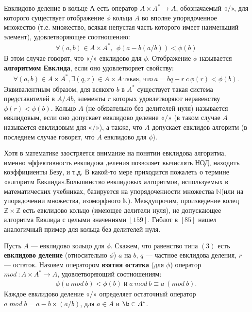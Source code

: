 \begin{determ}
Евклидово деление в кольце $А$ есть оператор $A\times A^* \rightarrow A$, обозначаемый «$/$», для которого существует отображение $\phi$ кольца $A$ во вполне упорядоченное множество (т.е. множество, всякая непустая часть которого имеет наименьший элемент), удовлетворяющее соотношению:
\begin{align}
\forall(a,b) \in A \times A^*, \:\: \phi(a - b(a/b)) < \phi(b)
\end{align}
В этом случае говорят, что «$/$» евклидово для $\phi$. Отображение $\phi$ называется \textbf{алгоритмом Евклида}, если оно удовлетворяет свойству:
\begin{align}
\forall(a,b) \in A \times A^*, \exists(q,r) \in A \times A \:\text{такая, что}\: a = bq + r \: c \:\phi(r) < \phi(b)\text{.}
\end{align}
Эквивалентным образом, для всякого $b$ в $A^*$ существует такая система представителей в $A/Ab$, элементы $r$ которых удовлетворяют неравенству $\phi(r)<\phi(b)$.
\newpage
\indent Кольцо $A$ (не обязательно без делителей нуля) называется евклидовым, если оно допускает евклидово деление «$/$» (в таком случае $A$ называется евклидовым для «$/$»), а также, что $A$ допускает евклидов алгоритм (в последнем случае говорят, что $A$ евклидово для $\phi$).
\end{determ}

\begin{mynotice}
Хотя в математике заостряется внимание на понятии евклидова алгоритма, именно эффективность евклидова деления позволяет вычислять НОД, находить коэффициенты Безу, и т.д. В какой-то мере приходится пожалеть о термине «алгоритм Евклида».\newline \indent Большинство евклидовых алгоритмов, используемых в математических учебниках, базируется на упорядоченности множества $\mathds{N}$(или на упорядочении множества, изоморфного $\mathds{N}$). Междупрочим, произведение колец $\mathds{Z} \times \mathds{Z}$ есть евклидово кольцо (имеющее делители нуля), не допускающее алгоритма Евклида с целыми значениями $[159]$. Гиблот в $[85]$ нашел аналогичный пример для кольца без делителей нуля.
\end{mynotice}

\begin{determ}
\textit{\indent} Пусть $A$ — евклидово кольцо для $\phi$. Скажем, что равенство типа $(3)$ есть \textbf{евклидово деление} (относительно $\phi$) $a$ на $b$, $q$ — частное евклидова деления, $r$ — остаток. Назовем оператором \textbf{взятия остатка} (для $\phi$) оператор $mod\::A \times A^* \rightarrow A$, удовлетворяющий соотношениям:
\begin{align*}
\phi(a\:mod\:b) < \phi(b)\;\text{и}\; a\:mod\:b\equiv a\:(mod\:b)\text{.}
\end{align*}
Каждое евклидово деление «$/$» определяет остаточный оператор\newline$a\;mod\;b = a - b \times (a/b)$, для $a \in A$ и $\b \in A^*$.
\end{determ}

